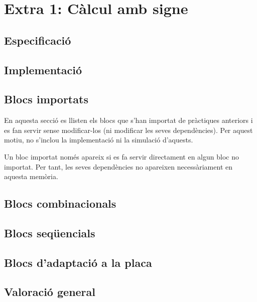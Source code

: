 \chapter{Extra 1: Càlcul amb signe}

\section{Especificació}

\section{Implementació}


\section{Blocs importats}

En aquesta secció es llisten els blocs que s'han importat de pràctiques
anteriors i es fan servir sense modificar-los (ni modificar les seves 
dependències). Per aquest motiu, no s'inclou la implementació ni la   
simulació d'aquests.

Un bloc importat només apareix si es fa servir directament en algun bloc
no importat. Per tant, les seves dependències no apareixen necessàriament
en aquesta memòria.


\section{Blocs combinacionals}

\section{Blocs seqüencials}

\section{Blocs d'adaptació a la placa}

\section{Valoració general}


